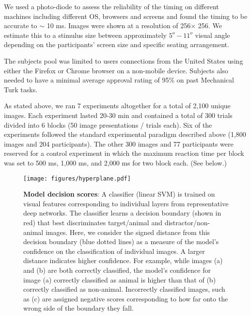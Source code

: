 \documentclass{article}
\begin{document}
We used a photo-diode to assess the reliability of the timing on different machines including different OS, browsers and screens and found the timing to be accurate to $\sim$ 10 ms. Images were shown at a resolution of 256$\times$ 256. We estimate this to a stimulus size between approximately $5^o - 11^o$ visual angle depending on the participants' screen size and specific seating arrangement.  


The subjects pool was limited to users connections from the United States using either the Firefox or Chrome browser on a non-mobile device. Subjects also needed to have a minimal average approval rating of 95\% on past Mechanical Turk tasks.




As stated above, we ran 7 experiments altogether for a total of 2,100 unique images. Each experiment lasted 20-30 min and contained a total of 300 trials divided into 6 blocks (50 image presentations / trials each). Six of the experiments followed the standard experimental paradigm described above (1,800 images and 204 participants). The other 300 images and 77 participants were reserved for a control experiment in which the maximum reaction time per block was set to 500 ms, 1,000 ms, and 2,000 ms for two block each. (See below.) 








\begin{figure}[t!]
  \begin{center}
    \texttt{[image: figures/hyperplane.pdf]}
    \caption[Model Confidence Metric]{\textbf{Model decision scores}: A classifier (linear SVM) is trained on visual features corresponding to individual layers  from representative deep networks. The classifier learns a decision boundary (shown in red) that best discriminates target/animal and distractor/non-animal images. Here, we consider the signed distance from this decision boundary (blue dotted lines) as a measure of the model's confidence on the classification of individual images. A larger distance indicates higher confidence. For example, while images (a) and (b) are both correctly classified, the model's confidence for image (a) correctly classified as animal is higher than that of (b) correctly classified as non-animal. Incorrectly classified images, such as (c) are assigned negative scores corresponding to how far onto the wrong side of the boundary they fall.
    \label{fig:methods:hyper}}
  \end{center}
\end{figure}
\end{document}
